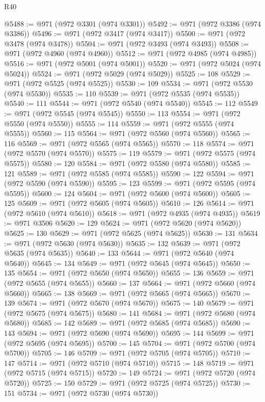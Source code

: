 \begin{lexlean}{R40}
\begin{coremodule}
@5488 := @971 (@972 @3301 (@974 @3301))
@5492 := @971 (@972 @3386 (@974 @3386))
@5496 := @971 (@972 @3417 (@974 @3417))
@5500 := @971 (@972 @3478 (@974 @3478))
@5504 := @971 (@972 @3493 (@974 @3493))
@5508 := @971 (@972 @4960 (@974 @4960))
@5512 := @971 (@972 @4985 (@974 @4985))
@5516 := @971 (@972 @5001 (@974 @5001))
@5520 := @971 (@972 @5024 (@974 @5024))
@5524 := @971 (@972 @5029 (@974 @5029))
@5525 := 108
@5529 := @971 (@972 @5525 (@974 @5525))
@5530 := 109
@5534 := @971 (@972 @5530 (@974 @5530))
@5535 := 110
@5539 := @971 (@972 @5535 (@974 @5535))
@5540 := 111
@5544 := @971 (@972 @5540 (@974 @5540))
@5545 := 112
@5549 := @971 (@972 @5545 (@974 @5545))
@5550 := 113
@5554 := @971 (@972 @5550 (@974 @5550))
@5555 := 114
@5559 := @971 (@972 @5555 (@974 @5555))
@5560 := 115
@5564 := @971 (@972 @5560 (@974 @5560))
@5565 := 116
@5569 := @971 (@972 @5565 (@974 @5565))
@5570 := 118
@5574 := @971 (@972 @5570 (@974 @5570))
@5575 := 119
@5579 := @971 (@972 @5575 (@974 @5575))
@5580 := 120
@5584 := @971 (@972 @5580 (@974 @5580))
@5585 := 121
@5589 := @971 (@972 @5585 (@974 @5585))
@5590 := 122
@5594 := @971 (@972 @5590 (@974 @5590))
@5595 := 123
@5599 := @971 (@972 @5595 (@974 @5595))
@5600 := 124
@5604 := @971 (@972 @5600 (@974 @5600))
@5605 := 125
@5609 := @971 (@972 @5605 (@974 @5605))
@5610 := 126
@5614 := @971 (@972 @5610 (@974 @5610))
@5618 := @971 (@972 @4935 (@974 @4935))
@5619 := @971 @3506
@5620 := 129
@5624 := @971 (@972 @5620 (@974 @5620))
@5625 := 130
@5629 := @971 (@972 @5625 (@974 @5625))
@5630 := 131
@5634 := @971 (@972 @5630 (@974 @5630))
@5635 := 132
@5639 := @971 (@972 @5635 (@974 @5635))
@5640 := 133
@5644 := @971 (@972 @5640 (@974 @5640))
@5645 := 134
@5649 := @971 (@972 @5645 (@974 @5645))
@5650 := 135
@5654 := @971 (@972 @5650 (@974 @5650))
@5655 := 136
@5659 := @971 (@972 @5655 (@974 @5655))
@5660 := 137
@5664 := @971 (@972 @5660 (@974 @5660))
@5665 := 138
@5669 := @971 (@972 @5665 (@974 @5665))
@5670 := 139
@5674 := @971 (@972 @5670 (@974 @5670))
@5675 := 140
@5679 := @971 (@972 @5675 (@974 @5675))
@5680 := 141
@5684 := @971 (@972 @5680 (@974 @5680))
@5685 := 142
@5689 := @971 (@972 @5685 (@974 @5685))
@5690 := 143
@5694 := @971 (@972 @5690 (@974 @5690))
@5695 := 144
@5699 := @971 (@972 @5695 (@974 @5695))
@5700 := 145
@5704 := @971 (@972 @5700 (@974 @5700))
@5705 := 146
@5709 := @971 (@972 @5705 (@974 @5705))
@5710 := 147
@5714 := @971 (@972 @5710 (@974 @5710))
@5715 := 148
@5719 := @971 (@972 @5715 (@974 @5715))
@5720 := 149
@5724 := @971 (@972 @5720 (@974 @5720))
@5725 := 150
@5729 := @971 (@972 @5725 (@974 @5725))
@5730 := 151
@5734 := @971 (@972 @5730 (@974 @5730))

\end{coremodule}
\end{lexlean}
